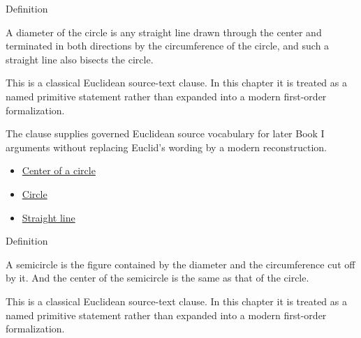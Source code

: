 \begin{definitionbox}{Definition}
\begin{definition}[Diameter]
\label{def:euclid-diameter}
A diameter of the circle is any straight line drawn through the center and
terminated in both directions by the circumference of the circle, and such a
straight line also bisects the circle.
\end{definition}
\end{definitionbox}
\begin{remark*}
This is a classical Euclidean source-text clause. In this chapter it is treated
as a named primitive statement rather than expanded into a modern first-order
formalization.
\end{remark*}

\begin{remark*}[Interpretation]
The clause supplies governed Euclidean source vocabulary for later Book I
arguments without replacing Euclid's wording by a modern reconstruction.
\end{remark*}

\begin{lra-not-visible}
\begin{dependencies}
\begin{itemize}
  \item \hyperref[def:euclid-center-of-a-circle]{Center of a circle}
  \item \hyperref[def:euclid-circle]{Circle}
  \item \hyperref[def:euclid-straight-line]{Straight line}
\end{itemize}
\end{dependencies}
\end{lra-not-visible}

\begin{definitionbox}{Definition}
\begin{definition}[Semicircle]
\label{def:euclid-semicircle}
A semicircle is the figure contained by the diameter and the circumference cut
off by it. And the center of the semicircle is the same as that of the circle.
\end{definition}
\end{definitionbox}
\begin{remark*}
This is a classical Euclidean source-text clause. In this chapter it is treated
as a named primitive statement rather than expanded into a modern first-order
formalization.
\end{remark*}

